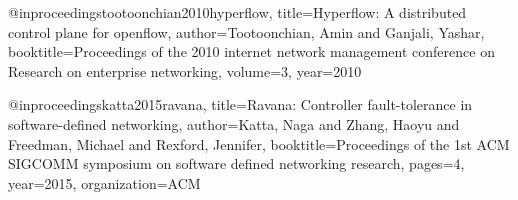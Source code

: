 @inproceedings{tootoonchian2010hyperflow,
  title={Hyperflow: A distributed control plane for openflow},
  author={Tootoonchian, Amin and Ganjali, Yashar},
  booktitle={Proceedings of the 2010 internet network management conference on Research on enterprise networking},
  volume={3},
  year={2010}
}

@inproceedings{katta2015ravana,
  title={Ravana: Controller fault-tolerance in software-defined networking},
  author={Katta, Naga and Zhang, Haoyu and Freedman, Michael and Rexford, Jennifer},
  booktitle={Proceedings of the 1st ACM SIGCOMM symposium on software defined networking research},
  pages={4},
  year={2015},
  organization={ACM}
}